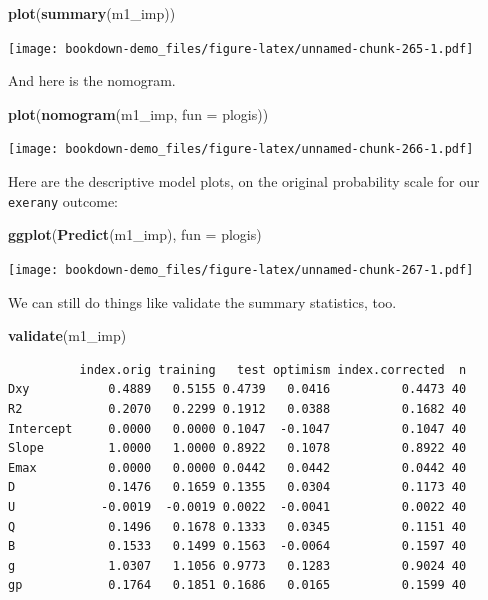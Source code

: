 \documentclass[]{book}
\newenvironment{Shaded}{\begin{snugshade}}{\end{snugshade}}
\newcommand{\KeywordTok}[1]{\textcolor[rgb]{0.13,0.29,0.53}{\textbf{#1}}}
\newcommand{\DataTypeTok}[1]{\textcolor[rgb]{0.13,0.29,0.53}{#1}}
\newcommand{\NormalTok}[1]{#1}
\theoremstyle{definition}
\theoremstyle{definition}
\theoremstyle{definition}
\theoremstyle{remark}
\begin{document}
\begin{Shaded}
\begin{Highlighting}[]
\KeywordTok{plot}\NormalTok{(}\KeywordTok{summary}\NormalTok{(m1_imp))}
\end{Highlighting}
\end{Shaded}

\texttt{[image: bookdown-demo\_files/figure-latex/unnamed-chunk-265-1.pdf]}

And here is the nomogram.

\begin{Shaded}
\begin{Highlighting}[]
\KeywordTok{plot}\NormalTok{(}\KeywordTok{nomogram}\NormalTok{(m1_imp, }\DataTypeTok{fun =}\NormalTok{ plogis))}
\end{Highlighting}
\end{Shaded}

\texttt{[image: bookdown-demo\_files/figure-latex/unnamed-chunk-266-1.pdf]}

Here are the descriptive model plots, on the original probability scale
for our \texttt{exerany} outcome:

\begin{Shaded}
\begin{Highlighting}[]
\KeywordTok{ggplot}\NormalTok{(}\KeywordTok{Predict}\NormalTok{(m1_imp), }\DataTypeTok{fun =}\NormalTok{ plogis)}
\end{Highlighting}
\end{Shaded}

\texttt{[image: bookdown-demo\_files/figure-latex/unnamed-chunk-267-1.pdf]}

We can still do things like validate the summary statistics, too.

\begin{Shaded}
\begin{Highlighting}[]
\KeywordTok{validate}\NormalTok{(m1_imp)}
\end{Highlighting}
\end{Shaded}

\begin{verbatim}
          index.orig training   test optimism index.corrected  n
Dxy           0.4889   0.5155 0.4739   0.0416          0.4473 40
R2            0.2070   0.2299 0.1912   0.0388          0.1682 40
Intercept     0.0000   0.0000 0.1047  -0.1047          0.1047 40
Slope         1.0000   1.0000 0.8922   0.1078          0.8922 40
Emax          0.0000   0.0000 0.0442   0.0442          0.0442 40
D             0.1476   0.1659 0.1355   0.0304          0.1173 40
U            -0.0019  -0.0019 0.0022  -0.0041          0.0022 40
Q             0.1496   0.1678 0.1333   0.0345          0.1151 40
B             0.1533   0.1499 0.1563  -0.0064          0.1597 40
g             1.0307   1.1056 0.9773   0.1283          0.9024 40
gp            0.1764   0.1851 0.1686   0.0165          0.1599 40
\end{verbatim}
\end{document}

